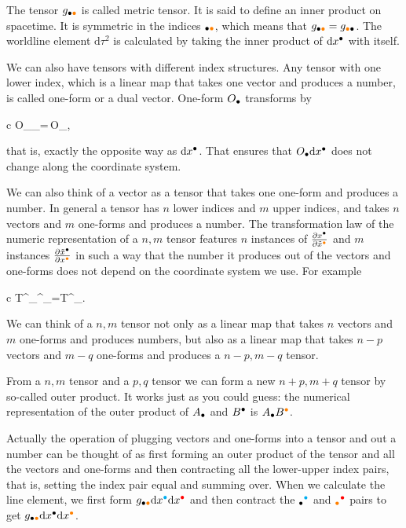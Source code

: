 \documentclass[11pt,oneside%
]{memoir}
\newenvironment{eqna}{\begin{IEEEeqnarray*}{c}}{\end{IEEEeqnarray*}\ignorespacesafterend}
\newcommand{\pder}[2]{\frac{\partial#1}{\partial#2}}
\newcommand{\dd}{\mathrm{d}}
\newcommand{\coa}{{\color{black}\bullet}}
\newcommand{\cob}{{\color{oranssi}\bullet}}
\newcommand{\coc}{{\color{cyan}\bullet}}
\newcommand{\cod}{{\color{red}\bullet}}
\newcommand{\coe}{{\color{magenta}\bullet}}
\newcommand{\cof}{{\color{green}\bullet}}
\begin{document}
The tensor \(g_{\coa\cob}\) is called metric tensor. It is said to define an inner product on spacetime. It is symmetric in the indices \(_{\coa\cob}\), which means that \(g_{\coa\cob}=g_{\cob\coa}\). The worldline element \(\dd\tau^2\) is calculated by taking the inner product of \(\dd x^\coa\) with itself.

We can also have tensors with different index structures. Any tensor with one lower index, which is a linear map that takes one vector and produces a number, is called one-form or a dual vector. One-form \(O_\coa\) transforms by
\begin{eqna}
O_\coa\rightarrow{}_\coa=\pder{x^\cob}{\tilde{x}^\coa}\,O_{\cob},
\end{eqna}
that is, exactly the opposite way as \(\dd x^\coa\). That ensures that \(O_\coa\dd x^\coa\) does not change along the coordinate system.

We can also think of a vector as a tensor that takes one one-form and produces a number. In general a tensor has \(n\) lower indices and \(m\) upper indices, and takes \(n\) vectors and \(m\) one-forms and produces a number. The transformation law of the numeric representation of a \(n,m\) tensor features \(n\) instances of \(\pder{x^\coa}{\tilde{x}^\cob}\) and \(m\) instances \(\pder{\tilde{x}^\coa}{x^\cob}\) in such a way that the number it produces out of the vectors and one-forms does not depend on the coordinate system we use. For example
\begin{eqna}
T^\coa_{\cob\coc}\rightarrow {}^\coa_{\cob\coc}=\pder{\tilde{x}^\coa}{x^\cod}\pder{x^\coe}{\tilde{x}^\cob}\pder{x^\cof}{\tilde{x}^\coc}T^\cod_{\coe\cof}.
\end{eqna}
We can think of a \(n,m\) tensor not only as a linear map that takes \(n\) vectors and \(m\) one-forms and produces numbers, but also as a linear map that takes \(n-p\) vectors and \(m-q\) one-forms and produces a \(n-p,m-q\) tensor.

From a \(n,m\) tensor and a \(p,q\) tensor we can form a new \(n+p,m+q\) tensor by so-called outer product. It works just as you could guess: the numerical representation of the outer product of \(A_\coa\) and \(B^\coa\) is \(A_\coa B^\cob\).

Actually the operation of plugging vectors and one-forms into a tensor and out a number can be thought of as first forming an outer product of the tensor and all the vectors and one-forms and then contracting all the lower-upper index pairs, that is, setting the index pair equal and summing over. When we calculate the line element, we first form \(g_{\coa\cob}\dd x^\coc\dd x^\cod\) and then contract the \(_\coa^\coc\) and \(_\cob^\cod\) pairs to get \(g_{\coa\cob}\dd x^\coa\dd x^\cob\).
\end{document}
